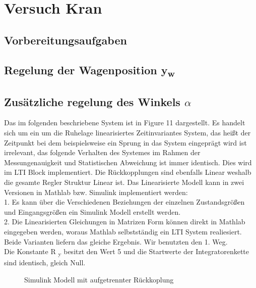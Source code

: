 \documentclass[10pt]{scrartcl}
\begin{document}
\section{Versuch Kran}
\subsection{Vorbereitungsaufgaben}
\subsection{Regelung der Wagenposition y\textsubscript{w}}
\subsection{Zusätzliche regelung des Winkels $\alpha$ }
Das im folgenden beschriebene System ist in Figure 11 dargestellt. 
Es handelt sich um ein um die Ruhelage linearisiertes Zeitinvariantes System, das heißt der Zeitpunkt bei dem beispielsweise ein Sprung in das System eingeprägt wird ist irrelevant, das folgende Verhalten des Systemes im Rahmen der Messungenauigkeit und Statistischen Abweichung ist immer identisch. Dies wird im LTI Block implementiert. Die Rückkopplungen sind ebenfalls Linear weshalb die gesamte Regler Struktur Linear ist.
Das Linearisierte Modell kann in zwei Versionen in Mathlab bzw. Simulink implementiert werden:\\
1. Es kann über die Verschiedenen Beziehungen der einzelnen Zustandsgrößen und Eingangsgrößen ein Simulink Modell erstellt werden.\\
2. Die Linearisierten Gleichungen in Matrizen Form können direkt in Mathlab eingegeben werden, woraus Mathlab selbstständig ein LTI System realiesiert. \\
Beide Varianten liefern das gleiche Ergebnis.
Wir benutzten den 1. Weg. \\
Die Konstante R \textsubscript{y} besitzt den Wert 5 und die Startwerte der Integratorenkette sind identisch, gleich Null.\\
\begin{figure} [H]
\caption{Simulink Modell mit aufgetrennter Rückkoplung} 
\end{figure}
\end{document}
